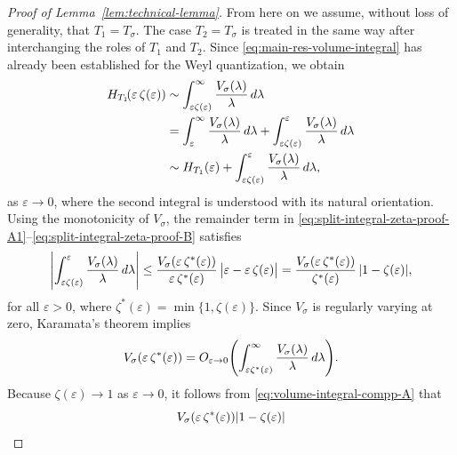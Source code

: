 \documentclass[a4paper,12pt]{article}
\let\originalleft\left
\let\originalright\right
\renewcommand{\left}{\mathopen{}\mathclose\bgroup\originalleft}
\renewcommand{\right}{\aftergroup\egroup\originalright}
\begin{document}
\begin{proof}[Proof of Lemma~\ref{lem:technical-lemma}]

From here on we assume, without loss of generality, that
$T_1=T_\sigma$. The case $T_2=T_\sigma$ is treated in the
same way after interchanging the roles of $T_1$ and $T_2$. Since \eqref{eq:main-res-volume-integral} has already been established
for the Weyl quantization, we obtain
\begin{align}
H_{T_1}\!\left(\varepsilon\,\zeta(\varepsilon)\right)
&\sim
\int_{\varepsilon\zeta(\varepsilon)}^\infty
\frac{V_\sigma(\lambda)}{\lambda}\,d\lambda
\label{eq:split-integral-zeta-proof-A1}\\
&=
\int_{\varepsilon}^{\infty}\frac{V_\sigma(\lambda)}{\lambda}\,d\lambda
+
\int_{\varepsilon\zeta(\varepsilon)}^{\varepsilon}
\frac{V_\sigma(\lambda)}{\lambda}\,d\lambda
\notag\\
&\sim
H_{T_1}(\varepsilon)
+
\int_{\varepsilon\zeta(\varepsilon)}^{\varepsilon}
\frac{V_\sigma(\lambda)}{\lambda}\,d\lambda,
\label{eq:split-integral-zeta-proof-B}
\end{align}
as $\varepsilon\to0$, where the second integral is understood with its
natural orientation. Using the monotonicity of $V_\sigma$, the remainder term in
\eqref{eq:split-integral-zeta-proof-A1}--\eqref{eq:split-integral-zeta-proof-B}
satisfies
\begin{equation}\label{eq:bound-remainder-volume-integral-A}
\left|
\int_{\varepsilon\zeta(\varepsilon)}^{\varepsilon}
\frac{V_\sigma(\lambda)}{\lambda}\,d\lambda
\right|
\le
\frac{V_\sigma \left(\varepsilon\,\zeta^*(\varepsilon)\right)}
     {\varepsilon\,\zeta^*(\varepsilon)}
\,
\bigl|\varepsilon-\varepsilon\,\zeta(\varepsilon)\bigr|
=
\frac{V_\sigma \left(\varepsilon\,\zeta^*(\varepsilon)\right)}
     {\zeta^*(\varepsilon)}
\,
|1-\zeta(\varepsilon)|,
\end{equation}
for all $\varepsilon>0$, where
$\zeta^*(\varepsilon)=\min\{1,\zeta(\varepsilon)\}$.
Since $V_\sigma$ is regularly varying at zero, Karamata’s theorem implies
\begin{equation}\label{eq:volume-integral-compp-A}
V_\sigma \left(\varepsilon\,\zeta^*(\varepsilon)\right)
=
O_{\varepsilon\to0} \left(
\int_{\varepsilon\zeta^*(\varepsilon)}^\infty
\frac{V_\sigma(\lambda)}{\lambda}\,d\lambda
\right).
\end{equation}
Because $\zeta(\varepsilon)\to1$ as $\varepsilon\to0$, it follows from
\eqref{eq:volume-integral-compp-A} that
\begin{equation}\label{eq:growth-control-volume-A}
V_\sigma \left(\varepsilon\,\zeta^*(\varepsilon)\right)
|1-\zeta(\varepsilon)|

\end{equation}
\end{proof}
\end{document}
